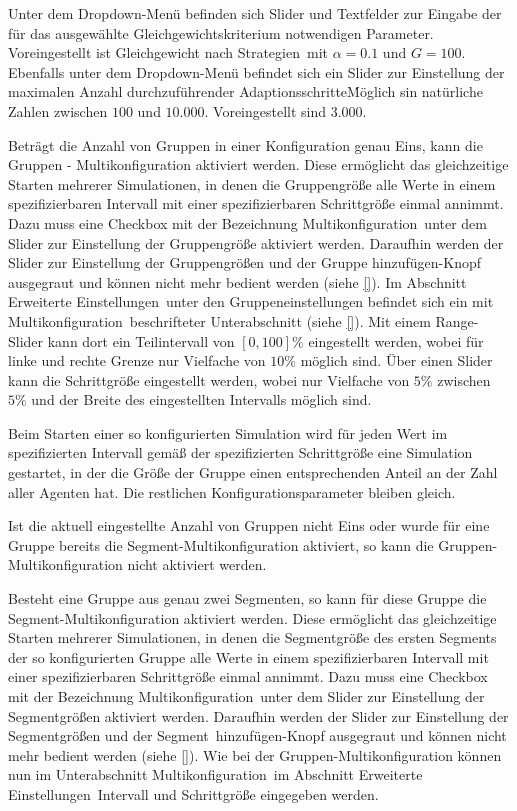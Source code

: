 \documentclass[parskip=full,11pt,twoside]{scrartcl}
\def\adapts{Adaptionsschritte}
\def\segment{Segment}
\def\segments{Segmente}
\begin{document}
Unter dem Dropdown-Menü befinden sich Slider und Textfelder zur Eingabe der für das ausgewählte Gleichgewichtskriterium notwendigen Parameter. Voreingestellt ist \glqq Gleichgewicht nach Strategien\grqq\ mit \(\alpha = 0.1\) und \(G = 100\). Ebenfalls unter dem Dropdown-Menü befindet sich ein Slider zur Einstellung der maximalen Anzahl durchzuführender \adapts\. Möglich sin natürliche Zahlen zwischen \(100\) und \(10.000\). Voreingestellt sind \(3.000\).

Beträgt die Anzahl von Gruppen in einer Konfiguration genau Eins, kann die Gruppen - Multikonfiguration aktiviert werden. Diese ermöglicht das gleichzeitige Starten mehrerer Simulationen, in denen die Gruppengröße alle Werte in einem spezifizierbaren Intervall mit einer spezifizierbaren Schrittgröße einmal annimmt. Dazu muss eine Checkbox mit der Bezeichnung \glqq Multikonfiguration\grqq\ unter dem Slider zur Einstellung der Gruppengröße aktiviert werden. Daraufhin werden der Slider zur Einstellung der Gruppengrößen und der \glqq Gruppe hinzufügen\grqq -Knopf ausgegraut und können nicht mehr bedient werden (siehe \cref{}). Im Abschnitt \glqq Erweiterte Einstellungen\grqq\ unter den Gruppeneinstellungen befindet sich ein mit \glqq Multikonfiguration\grqq\ beschrifteter Unterabschnitt (siehe \cref{}). Mit einem Range-Slider kann dort ein Teilintervall von \([0,100]\%\) eingestellt werden, wobei für linke und rechte Grenze nur Vielfache von \(10\%\) möglich sind. Über einen Slider kann die Schrittgröße eingestellt werden, wobei nur Vielfache von \(5\%\) zwischen \(5\%\) und der Breite des eingestellten Intervalls möglich sind.

Beim Starten einer so konfigurierten Simulation wird für jeden Wert im spezifizierten Intervall gemäß der spezifizierten Schrittgröße eine Simulation gestartet, in der die Größe der Gruppe einen entsprechenden Anteil an der Zahl aller Agenten hat. Die restlichen Konfigurationsparameter bleiben gleich.

Ist die aktuell eingestellte Anzahl von Gruppen nicht Eins oder wurde für eine Gruppe bereits die \segment -Multikonfiguration aktiviert, so kann die Gruppen-Multikonfiguration nicht aktiviert werden.

\functionality{Multikonfiguration von \segments n}{fnc:multikonfseg}
Besteht eine Gruppe aus genau zwei \segments n, so kann für diese Gruppe die \segment -Multikonfiguration aktiviert werden. Diese ermöglicht das gleichzeitige Starten mehrerer Simulationen, in denen die \segment größe des ersten \segment s der so konfigurierten Gruppe alle Werte in einem spezifizierbaren Intervall mit einer spezifizierbaren Schrittgröße einmal annimmt. Dazu muss eine Checkbox mit der Bezeichnung \glqq Multikonfiguration\grqq\ unter dem Slider zur Einstellung der \segment größen aktiviert werden. Daraufhin werden der Slider zur Einstellung der \segment größen und der \glqq \segment\ hinzufügen\grqq -Knopf ausgegraut und können nicht mehr bedient werden (siehe \cref{}). Wie bei der Gruppen-Multikonfiguration können nun im Unterabschnitt \glqq Multikonfiguration\grqq\ im Abschnitt \glqq Erweiterte Einstellungen\grqq\ Intervall und Schrittgröße eingegeben werden.
\end{document}
